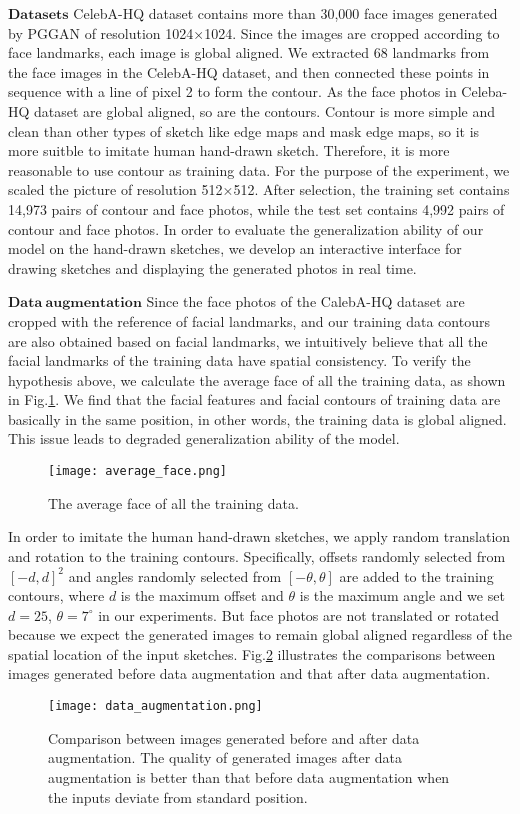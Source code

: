 \documentclass[10pt,twocolumn,letterpaper]{article}
\begin{document}
\noindent
$\mathbf{Datasets}$ CelebA-HQ dataset contains more than 30,000 face images generated by PGGAN\cite{pggan} of resolution 1024×1024. Since the images are cropped according to face landmarks, each image is global aligned. 
We extracted 68 landmarks from the face images in the CelebA-HQ dataset, and then connected these points in sequence with a line of pixel 2 to form the contour. As the face photos in Celeba-HQ dataset are global aligned, so are the contours. Contour is more simple and clean than other types of sketch like edge maps\cite{csagan} and mask edge maps\cite{maskgan}, so it is more suitble to imitate human hand-drawn sketch. Therefore, it is more reasonable to use contour as training data.
For the purpose of the experiment, we scaled the picture of resolution 512×512. After selection, the training set contains 14,973 pairs of contour and face photos, while the test set contains 4,992 pairs of contour and face photos. 
In order to evaluate the generalization ability of our model on the hand-drawn sketches, we develop an interactive interface for drawing sketches and displaying the generated photos in real time.

\noindent
$\mathbf{Data ~augmentation}$ Since the face photos of the CalebA-HQ dataset are cropped with the reference of facial landmarks, and our training data contours are also obtained based on facial landmarks, we intuitively believe that all the facial landmarks of the training data have spatial consistency. 
To verify the hypothesis above, we calculate the average face of all the training data, as shown in Fig.\ref{fig:average_face}. We find that the facial features and facial contours of training data are basically in the same position, in other words, the training data is global aligned. This issue leads to degraded generalization ability of the model. 
\begin{figure}[htb]
	\centering
	\texttt{[image: average\_face.png]}
	\caption{The average face of all the training data. }
	\label{fig:average_face}
\end{figure}
In order to imitate the human hand-drawn sketches, we apply random translation and rotation to the training contours. Specifically, offsets randomly selected from $[-d,d]^2$ and angles randomly selected from $[-\theta,\theta]$ are added to the training contours, where $d$ is the maximum offset and $\theta$ is the maximum angle and we set $d=25$, $\theta=7^\circ$ in our experiments. 
But face photos are not translated or rotated because we expect the generated images to remain global aligned regardless of the spatial location of the input sketches.
Fig.\ref{fig:data_augmentation} illustrates the comparisons between images generated before data augmentation and  that after data augmentation. 
\begin{figure}[htb]
	\centering
	\texttt{[image: data\_augmentation.png]}
	\caption{Comparison between images generated before and after data augmentation. The quality of generated images after data augmentation is better than that before data augmentation when the inputs deviate from standard position.}
	\label{fig:data_augmentation}
\end{figure}
\end{document}
